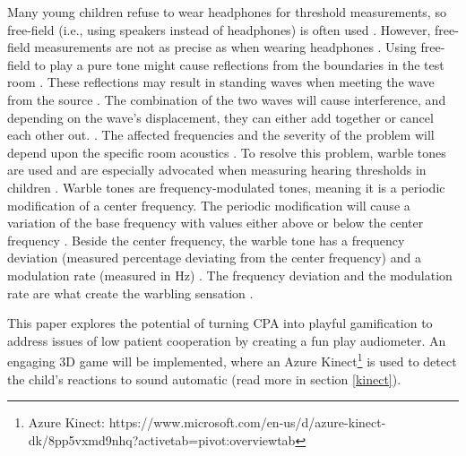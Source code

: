 Many young children refuse to wear headphones for threshold measurements, so free-field (i.e., using speakers instead of headphones) is often used \cite{WarbleTonesBook1}. However, free-field measurements are not as precise as when wearing headphones \cite{warbleTonesComparison}. Using free-field to play a pure tone might cause reflections from the boundaries in the test room \cite{warbleTonesComparison}. These reflections may result in standing waves when meeting the wave from the source  \cite{WarbleTonesBook1}. The combination of the two waves will cause interference, and depending on the wave's displacement, they can either add together or cancel each other out. \cite{WarbleTonesBook1}. The affected frequencies and the severity of the problem will depend upon the specific room acoustics \cite{warbleTonesComparison}. To resolve this problem, warble tones are used and are especially advocated when measuring hearing thresholds in children \cite{warbleTonesComparison}. Warble tones are frequency-modulated tones, meaning it is a periodic modification of a center frequency. The periodic modification will cause a variation of the base frequency with values either above or below the center frequency \cite{warbleTonesComparison}. Beside the center frequency, the warble tone has a frequency deviation (measured percentage deviating from the center frequency) and a modulation rate (measured in Hz) \cite{warbleTonesComparison, WarbleTonesBook1}. The frequency deviation and the modulation rate are what create the warbling sensation \cite{warbleTonesComparison}. \newline

This paper explores the potential of turning CPA into playful gamification to address issues of low patient cooperation by creating a fun play audiometer. An engaging 3D game will be implemented, where an Azure Kinect\footnote{Azure Kinect: https://www.microsoft.com/en-us/d/azure-kinect-dk/8pp5vxmd9nhq?activetab=pivot:overviewtab} is used to detect the child's reactions to sound automatic (read more in section \ref{kinect}).